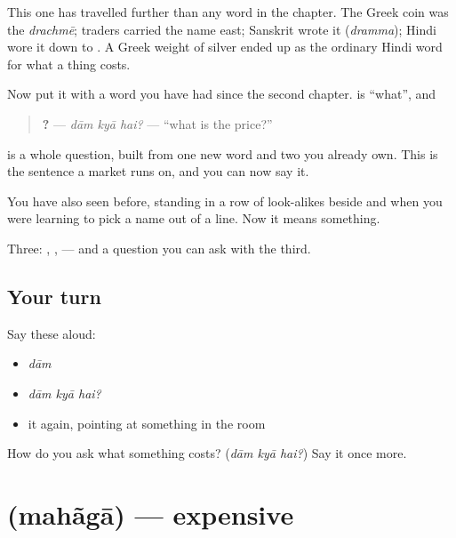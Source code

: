 This one has travelled further than any word in the chapter. The Greek coin was the \emph{drachmē}; traders carried the name east; Sanskrit wrote it  (\emph{dramma}); Hindi wore it down to . A Greek weight of silver ended up as the ordinary Hindi word for what a thing costs.

Now put it with a word you have had since the second chapter. \textbf{} is \textquotedblleft{}what\textquotedblright{}, and

\begin{quote}
\textbf{  ?} — \emph{dām kyā hai?} — \textquotedblleft{}what is the price?\textquotedblright{}
\end{quote}

is a whole question, built from one new word and two you already own. This is the sentence a market runs on, and you can now say it.

You have also seen  before, standing in a row of look-alikes beside \textbf{} and \textbf{} when you were learning to pick a name out of a line. Now it means something.

\begin{grammarlens}[title={What you've built}]
Three: , ,  — and a question you can ask with the third.
\end{grammarlens}

\subsection*{Your turn}
Say these aloud:

\begin{itemize}
\raggedright
  \item \emph{dām}
  \item \emph{dām kyā hai?}
  \item it again, pointing at something in the room
\end{itemize}

\begin{tcolorbox}[breakable,colback=teal!4,colframe=teal!35!black,title={Before you move on}]
How do you ask what something costs? (\emph{dām kyā hai?}) Say it once more.
\end{tcolorbox}
\section[mahãgā]{ (mahãgā) — expensive}

\label{lesson:HI-C72-expensive}



